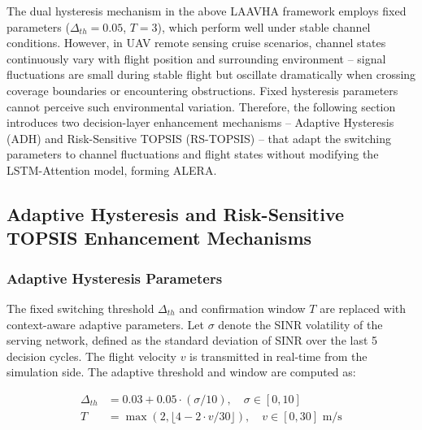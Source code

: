 \documentclass[journal,article,submit,moreauthors]{Definitions/mdpi}
\begin{document}
The dual hysteresis mechanism in the above LAAVHA framework employs fixed parameters ($\Delta_{th} = 0.05$, $T = 3$), which perform well under stable channel conditions. However, in UAV remote sensing cruise scenarios, channel states continuously vary with flight position and surrounding environment -- signal fluctuations are small during stable flight but oscillate dramatically when crossing coverage boundaries or encountering obstructions. Fixed hysteresis parameters cannot perceive such environmental variation. Therefore, the following section introduces two decision-layer enhancement mechanisms -- Adaptive Hysteresis (ADH) and Risk-Sensitive TOPSIS (RS-TOPSIS) -- that adapt the switching parameters to channel fluctuations and flight states without modifying the LSTM-Attention model, forming ALERA.

\subsection{Adaptive Hysteresis and Risk-Sensitive TOPSIS Enhancement Mechanisms}
\label{sec:enhanced}

\subsubsection{Adaptive Hysteresis Parameters}

The fixed switching threshold $\Delta_{th}$ and confirmation window $T$ are replaced with context-aware adaptive parameters. Let $\sigma$ denote the SINR volatility of the serving network, defined as the standard deviation of SINR over the last 5 decision cycles. The flight velocity $v$ is transmitted in real-time from the simulation side. The adaptive threshold and window are computed as:

\begin{equation}
\begin{aligned}
\Delta_{th} &= 0.03 + 0.05 \cdot (\sigma / 10), \quad \sigma \in [0, 10] \\
T &= \max(2, \lfloor 4 - 2 \cdot v / 30 \rfloor), \quad v \in [0, 30] \text{ m/s}
\end{aligned}
\label{eq:adh}
\end{equation}
\end{document}
